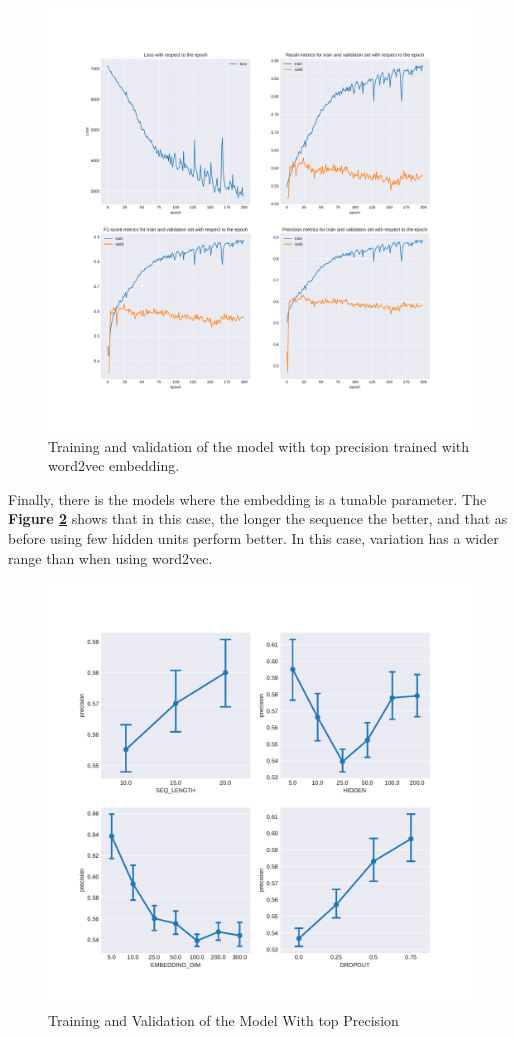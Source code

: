 \begin{figure}
 \centering
 \includegraphics[width=\textwidth]{images/chapitre4/attention1}
 \caption{Training and validation of the model with top precision trained with word2vec embedding.}
 \label{fig:chap4:att1:train}
\end{figure}
Finally, there is the models where the embedding is a tunable parameter. The \textbf{Figure \ref{fig:chap4:att3:confInt2}} shows that in this case, the longer the sequence the better, and that as before using few hidden units perform better. In this case, variation has a wider range than when using word2vec. 
\begin{figure}
 \centering
 \includegraphics[width=\textwidth]{images/chapitre4/confInt_precision_liar_attention_200}
 \caption{Training and Validation of the Model With top Precision}
 \label{fig:chap4:att3:confInt2}
\end{figure}
